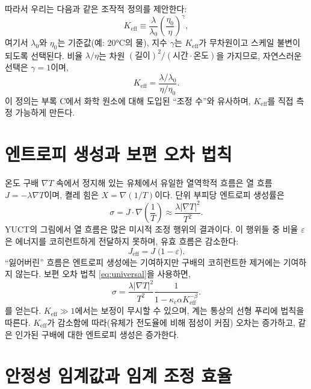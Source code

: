\documentclass[12pt,a4paper]{article}
\begin{document}
	따라서 우리는 다음과 같은 조작적 정의를 제안한다:
	\begin{equation}\label{eq:Keff-fluid}
		K_{\mathrm{eff}} \equiv \frac{\lambda}{\lambda_0} \left( \frac{\eta_0}{\eta} \right)^{\gamma},
	\end{equation}
	여기서 \(\lambda_0\)와 \(\eta_0\)는 기준값(예: 20°C의 물), 지수 \(\gamma\)는 \(K_{\mathrm{eff}}\)가 무차원이고 스케일 불변이 되도록 선택된다. 비율 \(\lambda/\eta\)는 차원 \((\text{길이})^2/(\text{시간}\cdot\text{온도})\)을 가지므로, 자연스러운 선택은 \(\gamma = 1\)이며,
	\begin{equation}\label{eq:Keff-fluid2}
		K_{\mathrm{eff}} = \frac{\lambda / \lambda_0}{\eta / \eta_0}.
	\end{equation}
	이 정의는 부록 C에서 화학 원소에 대해 도입된 ``조정 수''와 유사하며, \(K_{\mathrm{eff}}\)를 직접 측정 가능하게 만든다.
	
	\section{엔트로피 생성과 보편 오차 법칙}
	
	온도 구배 \(\nabla T\) 속에서 정지해 있는 유체에서 유일한 열역학적 흐름은 열 흐름 \(J = -\lambda \nabla T\)이며, 켤레 힘은 \(X = \nabla(1/T)\)이다. 단위 부피당 엔트로피 생성률은
	\begin{equation}\label{eq:sigma}
		\sigma = J \cdot \nabla\left(\frac{1}{T}\right) \approx \frac{\lambda |\nabla T|^2}{T^2}.
	\end{equation}
	YUCT의 그림에서 열 흐름은 많은 미시적 조정 행위의 결과이다. 이 행위들 중 비율 \(\varepsilon\)은 에너지를 코히런트하게 전달하지 못하며, 유효 흐름은 감소한다:
	\begin{equation}\label{eq:J-effective}
		J_{\mathrm{eff}} = J \; \bigl(1 - \varepsilon\bigr).
	\end{equation}
	``잃어버린'' 흐름은 엔트로피 생성에는 기여하지만 구배의 코히런트한 제거에는 기여하지 않는다. 보편 오차 법칙 \eqref{eq:universal}을 사용하면,
	\begin{equation}\label{eq:sigma-K}
		\sigma = \frac{\lambda |\nabla T|^2}{T^2} \frac{1}{1 - \kappa_c\alpha K_{\mathrm{eff}}^{-\beta}}.
	\end{equation}
	를 얻는다. \(K_{\mathrm{eff}} \gg 1\)에서는 보정이 무시할 수 있으며, 계는 통상의 선형 푸리에 법칙을 따른다. \(K_{\mathrm{eff}}\)가 감소함에 따라(유체가 전도율에 비해 점성이 커짐) 오차는 증가하고, 같은 인가된 구배에 대한 엔트로피 생성은 증가한다.
	
	\section{안정성 임계값과 임계 조정 효율}
	
\end{document}
